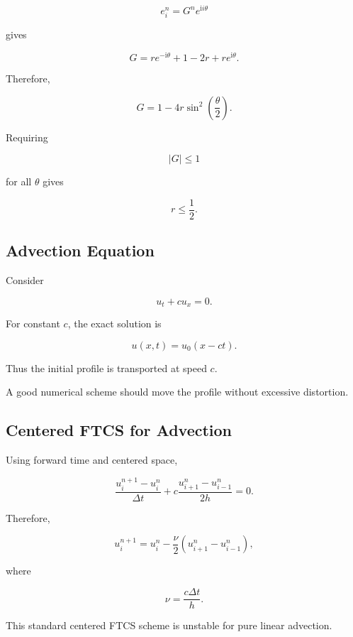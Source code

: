 \[
e_i^n
=
G^n e^{\mathrm{i}i\theta}
\]

gives

\[
G
=
r e^{-\mathrm{i}\theta}
+
1-2r
+
r e^{\mathrm{i}\theta}.
\]

Therefore,

\[
\boxed{
G
=
1
-
4r
\sin^2
\left(
\frac{\theta}{2}
\right).
}
\]

Requiring

\[
|G|\leq1
\]

for all \(\theta\) gives

\[
\boxed{
r\leq\frac12.
}
\]

\subsection{Advection Equation}
\label{subsec:numerical-advection-equation}

Consider

\[
\boxed{
u_t
+
cu_x
=
0.
}
\]

For constant \(c\), the exact solution is

\[
\boxed{
u(x,t)
=
u_0(x-ct).
}
\]

Thus the initial profile is transported at speed \(c\).

A good numerical scheme should move the profile without excessive
distortion.

\subsection{Centered FTCS for Advection}
\label{subsec:centered-ftcs-advection}

Using forward time and centered space,

\[
\boxed{
\frac{
u_i^{n+1}-u_i^n
}{
\Delta t
}
+
c
\frac{
u_{i+1}^n-u_{i-1}^n
}{
2h
}
=
0.
}
\]

Therefore,

\[
\boxed{
u_i^{n+1}
=
u_i^n
-
\frac{\nu}{2}
\left(
u_{i+1}^n-u_{i-1}^n
\right),
}
\]

where

\[
\boxed{
\nu
=
\frac{
c\Delta t
}{
h
}.
}
\]

This standard centered FTCS scheme is unstable for pure linear advection.

